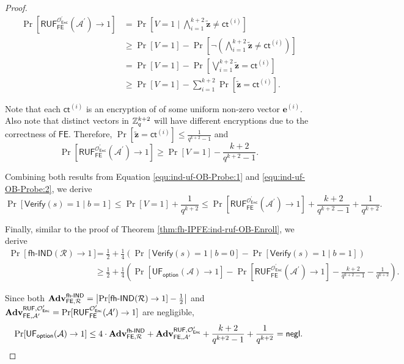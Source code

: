\begin{proof}
\begin{align*}
	\Pr[\textsf{RUF}_\textsf{FE}^{\mathcal{O}^\prime_{\textsf{Enc}}}(\mathcal{A}^\prime) \to 1] 
	&= \Pr\left[ V = 1 \mid \bigwedge_{i=1}^{k+2} \mathbf{\tilde{z}} \neq \textsf{ct}^{(i)} \right] \\ 
	& \geq \Pr[V = 1] - \Pr \left[ \neg  \left( \bigwedge_{i=1}^{k+2} \mathbf{\tilde{z}} \neq \textsf{ct}^{(i)} \right) \right] \\
	& = \Pr[V = 1] - \Pr \left[ \bigvee_{i=1}^{k+2} \mathbf{\tilde{z}} = \textsf{ct}^{(i)} \right] \\
	& \geq \Pr[V = 1] - \sum_{i=1}^{k+2} \Pr[\mathbf{\tilde{z}} = \textsf{ct}^{(i)}].
\end{align*}

\noindent Note that each $\textsf{ct}^{(i)}$ is an encryption of of some uniform non-zero vector $\mathbf{e}^{(i)}$. Also note that distinct vectors in $\mathbb{Z}_q^{k+2}$ will have different encryptions due to the correctness of $\textsf{FE}$. Therefore, $\Pr[\mathbf{\tilde{z}} = \textsf{ct}^{(i)}] \leq \frac{1}{q^{k+2} - 1}$ and
\[
	\Pr[\textsf{RUF}_\textsf{FE}^{\mathcal{O}^\prime_{\textsf{Enc}}}(\mathcal{A}^\prime) \to 1] \geq \Pr[V = 1] - \frac{k+2}{q^{k+2}-1}.
\]

\noindent Combining both results from Equation \ref{equ:ind-uf-OB-Probe:1} and \ref{equ:ind-uf-OB-Probe:2}, we derive
\[
	\Pr[\textsf{Verify}(s) = 1 \mid b = 1] \leq \Pr[V = 1] + \frac{1}{q^{k+2}} \leq \Pr[\textsf{RUF}_\textsf{FE}^{\mathcal{O}^\prime_{\textsf{Enc}}}(\mathcal{A}^\prime) \to 1] + \frac{k+2}{q^{k+2}-1} + \frac{1}{q^{k+2}}.
\]

Finally, similar to the proof of Theorem \ref{thm:fh-IPFE:ind-ruf-OB-Enroll}, we derive
\begin{align*}
	\Pr[\textsf{fh-IND}(\mathcal{R}) \to 1]
	&= \frac{1}{2} + \frac{1}{4} \left( \Pr[\textsf{Verify}(s) = 1 \mid b = 0] - \Pr[\textsf{Verify}(s) = 1 \mid b = 1] \right) \\
	&\geq \frac{1}{2} + \frac{1}{4} \left( \Pr[\textsf{UF}_\textsf{option}(\mathcal{A}) \to 1] - \Pr[\textsf{RUF}_\textsf{FE}^{\mathcal{O}^\prime_{\textsf{Enc}}}(\mathcal{A}^\prime) \to 1] - \frac{k+2}{q^{k+2}-1} - \frac{1}{q^{k+2}} \right).
\end{align*}

\noindent Since both $\mathbf{Adv}_{\textsf{FE}, \mathcal{R}}^\textsf{fh-IND} = \left| \Pr[\textsf{fh-IND}(\mathcal{R}) \to 1] - \frac{1}{2} \right|$ and $\mathbf{Adv}_{\textsf{FE}, \mathcal{A}^\prime}^{\textsf{RUF}, \mathcal{O}^\prime_{\textsf{Enc}}} = \Pr[\textsf{RUF}^{\mathcal{O}^\prime_{\textsf{Enc}}}_{\textsf{FE}}(\mathcal{A}^\prime) \to 1 ]$ are negligible,
\[
	\Pr[\textsf{UF}_\textsf{option}(\mathcal{A}) \to 1] \leq 4 \cdot \mathbf{Adv}_{\textsf{FE}, \mathcal{R}}^\textsf{fh-IND} + \mathbf{Adv}_{\textsf{FE}, \mathcal{A}^\prime}^{\textsf{RUF}, \mathcal{O}^\prime_{\textsf{Enc}}} + \frac{k+2}{q^{k+2}-1} + \frac{1}{q^{k+2}} = \mathsf{negl}.
\]

\end{proof}

